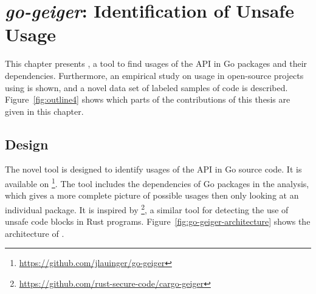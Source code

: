 
\chapter{\textit{go-geiger}: Identification of Unsafe Usage}\label{ch:go-geiger}

This chapter presents \toolGeiger{}, a tool to find usages of the \unsafe{} \acrshort{API} in Go packages and their
dependencies.
Furthermore, an empirical study on \unsafe{} usage in open-source projects using \toolGeiger{} is shown, and a novel
data set of labeled samples of \unsafe{} code is described.
Figure~\ref{fig:outline4} shows which parts of the contributions of this thesis are given in this chapter.





\section{Design}\label{sec:go-geiger:design}

The novel tool \toolGeiger{} is designed to identify usages of the \unsafe{} \acrshort{API} in Go source code.
It is available on \github{}\footnote{\url{https://github.com/jlauinger/go-geiger}}.
The tool includes the dependencies of Go packages in the analysis, which gives a more complete picture of possible \unsafe{}
usages then only looking at an individual package.
It is inspired by \toolCargoGeiger{}\footnote{\url{https://github.com/rust-secure-code/cargo-geiger}}, a similar tool
for detecting the use of unsafe code blocks in Rust programs.
Figure~\ref{fig:go-geiger-architecture} shows the architecture of \toolGeiger{}.



